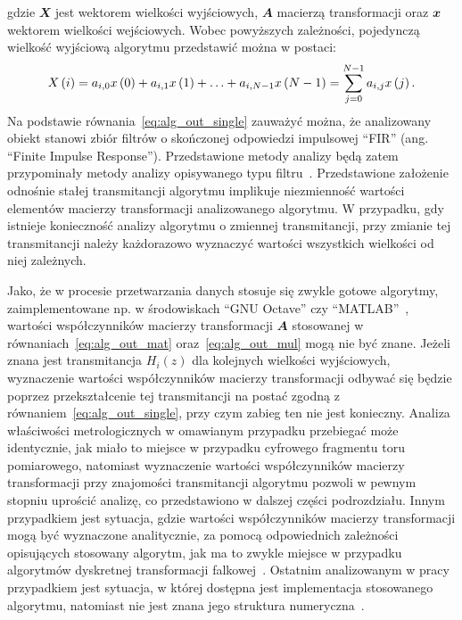 gdzie $\mathbfit{X}$ jest wektorem wielkości wyjściowych, $\mathbfit{A}$ macierzą transformacji oraz $\mathbfit{x}$ wektorem wielkości wejściowych. Wobec powyższych zależności, pojedynczą wielkość wyjściową algorytmu przedstawić można w postaci:
\begin{equation}
X \left(i\right) = a_{i, 0} x \left(0\right) + a_{i, 1} x \left(1\right) + \hdots + a_{i, N-1} x \left(N-1\right) = \sum _{j = 0} ^{N-1} a_{i,j} x \left(j\right) \label{eq:alg_out_single}.
\end{equation}
Na podstawie równania~\eqref{eq:alg_out_single} zauważyć można, że analizowany obiekt stanowi zbiór filtrów o skończonej odpowiedzi impulsowej \enquote{FIR} (ang. \enquote{Finite Impulse Response}). Przedstawione metody analizy będą zatem przypominały metody analizy opisywanego typu filtru~\cite{mehrnia_fir}. Przedstawione założenie odnośnie stałej transmitancji algorytmu implikuje niezmienność wartości elementów macierzy transformacji analizowanego algorytmu. W przypadku, gdy istnieje konieczność analizy algorytmu o zmiennej transmitancji, przy zmianie tej transmitancji należy każdorazowo wyznaczyć wartości wszystkich wielkości od niej zależnych.

Jako, że w procesie przetwarzania danych stosuje się zwykle gotowe algorytmy, zaimplementowane np. w środowiskach \enquote{GNU Octave} czy \enquote{MATLAB}~\cite{pruuvsa_dwt, lee_pywavelets}, wartości współczynników macierzy transformacji $\mathbfit{A}$ stosowanej w równaniach~\eqref{eq:alg_out_mat} oraz~\eqref{eq:alg_out_mul} mogą nie być znane. Jeżeli znana jest transmitancja $H_{i}(z)$ dla kolejnych wielkości wyjściowych, wyznaczenie wartości współczynników macierzy transformacji odbywać się będzie poprzez przekształcenie tej transmitancji na postać zgodną z równaniem~\eqref{eq:alg_out_single}, przy czym zabieg ten nie jest konieczny. Analiza właściwości metrologicznych w omawianym przypadku przebiegać może identycznie, jak miało to miejsce w przypadku cyfrowego fragmentu toru pomiarowego, natomiast wyznaczenie wartości współczynników macierzy transformacji przy znajomości transmitancji algorytmu pozwoli w pewnym stopniu uprościć analizę, co przedstawiono w dalszej części podrozdziału. Innym przypadkiem jest sytuacja, gdzie wartości współczynników macierzy transformacji mogą być wyznaczone analitycznie, za pomocą odpowiednich zależności opisujących stosowany algorytm, jak ma to zwykle miejsce w przypadku algorytmów dyskretnej transformacji falkowej~\cite{vonesch_dbbasics}. Ostatnim analizowanym w pracy przypadkiem jest sytuacja, w której dostępna jest implementacja stosowanego algorytmu, natomiast nie jest znana jego struktura numeryczna~\cite{misiti_matlabwav}.

